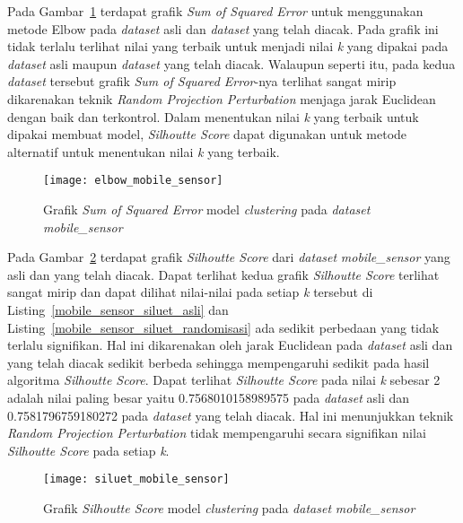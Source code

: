 Pada Gambar~\ref{fig:elbow_mobile_sensor} terdapat grafik \textit{Sum of Squared Error} untuk menggunakan metode Elbow pada \textit{dataset} asli dan \textit{dataset} yang telah diacak. Pada grafik ini tidak terlalu terlihat nilai yang terbaik untuk menjadi nilai \textit{k} yang dipakai pada \textit{dataset} asli maupun \textit{dataset} yang telah diacak. Walaupun seperti itu, pada kedua \textit{dataset} tersebut grafik \textit{Sum of Squared Error}-nya terlihat sangat mirip dikarenakan teknik \textit{Random Projection Perturbation} menjaga jarak Euclidean dengan baik dan terkontrol. Dalam menentukan nilai \textit{k} yang terbaik untuk dipakai membuat model, \textit{Silhoutte Score} dapat digunakan untuk metode alternatif untuk menentukan nilai \textit{k} yang terbaik.

\begin{figure}
	\centering
	\texttt{[image: elbow\_mobile\_sensor]}
	\caption{Grafik \textit{Sum of Squared Error} model \textit{clustering} pada \textit{dataset} \textit{mobile\_sensor}}
	\label{fig:elbow_mobile_sensor}
\end{figure}

Pada Gambar~\ref{fig:siluet_mobile_sensor} terdapat grafik \textit{Silhoutte Score} dari \textit{dataset} \textit{mobile\_sensor} yang asli dan yang telah diacak. Dapat terlihat kedua grafik \textit{Silhoutte Score} terlihat sangat mirip dan dapat dilihat nilai-nilai pada setiap \textit{k} tersebut di Listing~\ref{mobile_sensor_siluet_asli} dan Listing~\ref{mobile_sensor_siluet_randomisasi} ada sedikit perbedaan yang tidak terlalu signifikan. Hal ini dikarenakan oleh jarak Euclidean pada \textit{dataset} asli dan yang telah diacak sedikit berbeda sehingga mempengaruhi sedikit pada hasil algoritma \textit{Silhoutte Score}. Dapat terlihat \textit{Silhoutte Score} pada nilai \textit{k} sebesar 2 adalah nilai paling besar yaitu 0.7568010158989575 pada \textit{dataset} asli dan 0.7581796759180272 pada \textit{dataset} yang telah diacak. Hal ini menunjukkan teknik \textit{Random Projection Perturbation} tidak mempengaruhi secara signifikan nilai \textit{Silhoutte Score} pada setiap \textit{k}.

\begin{figure}
	\centering
	\texttt{[image: siluet\_mobile\_sensor]}
	\caption{Grafik \textit{Silhoutte Score} model \textit{clustering} pada \textit{dataset} \textit{mobile\_sensor}}
	\label{fig:siluet_mobile_sensor}
\end{figure}
	
